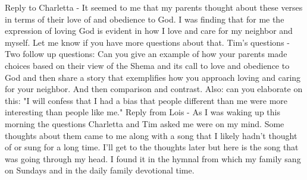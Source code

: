 Reply to Charletta - It seemed to me that my parents thought about these verses in terms of their love of and obedience to God. I was finding that for me the expression of loving God is evident in how I love and care for my neighbor and myself. Let me know if you have more questions about that.
Tim's questions - Two follow up questions: Can you give an example of how your parents made choices based on their view of the Shema and its call to love and obedience to God and then share a story that exemplifies how you approach loving and caring for your neighbor. And then comparison and contrast.
Also: can you elaborate on this: "I will confess that I had a bias that people different than me were more interesting than people like me."
Reply from Lois - As I was waking up this morning the questions Charletta and Tim asked me were on my mind. Some thoughts about them came to me along with a song that I likely hadn't thought of or sung for a long time. I'll get to the thoughts later but here is the song that was going through my head. I found it in the hymnal from which my family sang on Sundays and in the daily family devotional time.

